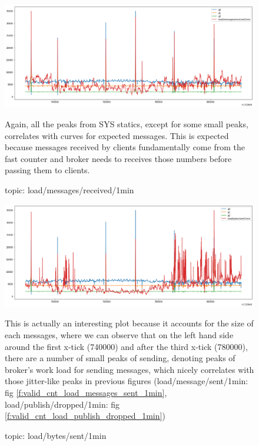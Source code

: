 \documentclass[12pt, letterpaper]{article}
\begin{document}
\begin{figure}
	\caption{topic: load/messages/received/1min}
	\label{f:valid_cnt_load_messages_received_1min}
	\begin{center}
		\includegraphics[width=\textwidth]{valid_cnt/valid_cnt-load_messages_received_1min}		
	\end{center}
	Again, all the peaks from SYS statics, except for some small peaks, correlates with curves for expected messages. This is expected because messages received by clients fundamentally come from the fast counter and broker needs to receives those numbers before passing them to clients.
\end{figure}

\begin{figure}
	\setlength{\tabcolsep}{0pt}
	\caption{topic: load/bytes/sent/1min}
	\label{f:valid_cnt_load_bytes_sent_1min}
	\begin{center}
		\includegraphics[width=\textwidth]{valid_cnt/valid_cnt-load_bytes_sent_1min}			
	\end{center}
	This is actually an interesting plot because it accounts for the size of each messages, where we can observe that on the left hand side around the first x-tick (740000) and after the third x-tick (780000), there are a number of small peaks of sending, denoting peaks of broker's work load for sending messages, which nicely correlates with those jitter-like peaks in previous figures (load/message/sent/1min: fig \ref{f:valid_cnt_load_messages_sent_1min}, load/publish/dropped/1min: fig \ref{f:valid_cnt_load_publish_dropped_1min}) 
\end{figure}
\end{document}
